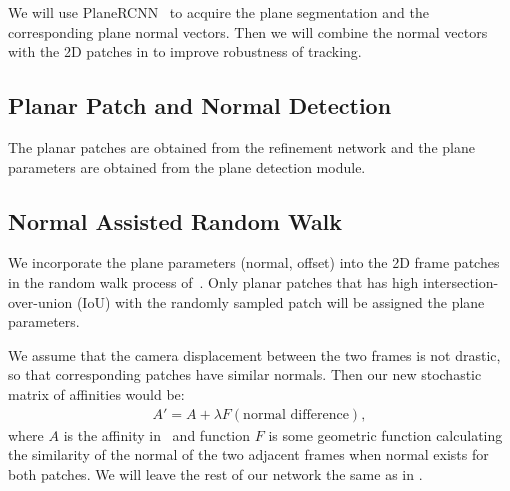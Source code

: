 
We will use PlaneRCNN~\cite{liu2019planercnn} to acquire the plane segmentation and the corresponding plane normal vectors. Then we will combine the normal vectors with the 2D patches in \cite{jabri2020walk} to improve robustness of tracking.

\subsection{Planar Patch and Normal Detection}
The planar patches are obtained from the refinement network and the plane parameters are obtained from the plane detection module.

\subsection{Normal Assisted Random Walk}
We incorporate the plane parameters (normal, offset) into the 2D frame patches in the random walk process of~\cite{jabri2020walk}. Only planar patches that has high intersection-over-union (IoU) with the randomly sampled patch will be assigned the plane parameters. 


We assume that the camera displacement between the two frames is not drastic, so that corresponding patches have similar normals. Then our new stochastic matrix of affinities would be:
\begin{eqnarray}
\label{eqn_new_affinities}
A'= A + \lambda F(\text{normal difference}), 
\end{eqnarray}
where $A$ is the affinity in~\cite{jabri2020walk} and function $F$ is some geometric function calculating the similarity of the normal of the two adjacent frames when normal exists for both patches. 
We will leave the rest of our network the same as in \cite{jabri2020walk}.